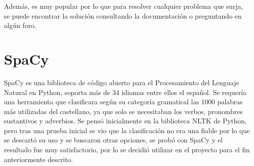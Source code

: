 Además, es muy popular por lo que para resolver cualquier problema que surja, se puede encontrar la solución consultando la documentación o preguntando en algún foro.

\section{SpaCy}
\label{cap:sec:spacy}
SpaCy es una biblioteca de código abierto para el Procesamiento del Lenguaje Natural en Python, soporta más de 34 idiomas entre ellos el español. Se requería una herramienta que clasificara según su categoría gramatical las 1000 palabras más utilizadas del castellano, ya que solo se necesitaban los verbos, pronombres sustantivos y adverbios. Se pensó inicialmente en la biblioteca NLTK de Python, pero tras una prueba inicial se vio que la clasificación no era una fiable por lo que se descartó su uso y se buscaron otras opciones, se probó con SpaCy y el resultado fue muy satisfactorio, por lo se decidió utilizar en el proyecto para el fin anteriormente descrito.




